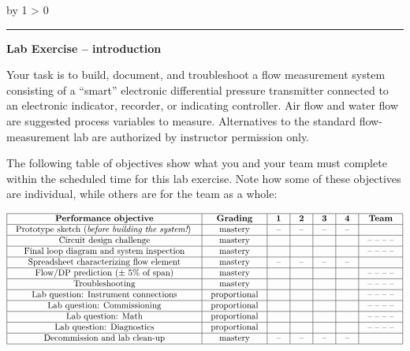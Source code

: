 \documentclass[12pt,a4paper]{article}
\def\oppgave{
            \advance\questnum by 1
            \ifnum \questnum > 0
                 \hrule
                 \vskip 3pt
                 \leftline{Oppgave \the\questnum}
                 \vskip 3pt \fi}
\begin{document}
\begin{itemize}



\vfil \eject 



\oppgave{} 

\noindent
{\bf Lab Exercise -- introduction}

\vskip 5pt

Your task is to build, document, and troubleshoot a flow measurement system consisting of a ``smart'' electronic differential pressure transmitter connected to an electronic indicator, recorder, or indicating controller.  Air flow and water flow are suggested process variables to measure.  Alternatives to the standard flow-measurement lab are authorized by instructor permission only.

The following table of objectives show what you and your team must complete within the scheduled time for this lab exercise.  Note how some of these objectives are individual, while others are for the team as a whole:



$$\vbox{\offinterlineskip
\halign{\strut
\vrule \quad\hfil # \ \hfil & 
\vrule \quad\hfil # \ \hfil & 
\vrule \quad\hfil # \ \hfil & 
\vrule \quad\hfil # \ \hfil & 
\vrule \quad\hfil # \ \hfil & 
\vrule \quad\hfil # \ \hfil & 
\vrule \quad\hfil # \ \hfil \vrule \cr
\noalign{\hrule}
%
{\bf Performance objective} & {\bf Grading} & {\bf 1} & {\bf 2} & {\bf 3} & {\bf 4} & {\bf Team} \cr
%
\noalign{\hrule}
%
Prototype sketch ({\it before building the system!}) & mastery & -- & -- & -- & -- & \cr
%
\noalign{\hrule}
%
Circuit design challenge & mastery & & & & & -- -- -- -- \cr
%
\noalign{\hrule}
%
Final loop diagram and system inspection & mastery & & & & & -- -- -- -- \cr
%
\noalign{\hrule}
%
Spreadsheet characterizing flow element & mastery & -- & -- & -- & -- &  \cr
%
\noalign{\hrule}
%
Flow/DP prediction ($\pm$ 5\% of span) & mastery & & & & & -- -- -- -- \cr
%
\noalign{\hrule}
%
Troubleshooting & mastery & & & & & -- -- -- -- \cr
%
\noalign{\hrule}
%
Lab question: Instrument connections & proportional &  &  &  &  & -- -- -- -- \cr
%
\noalign{\hrule}
%
Lab question: Commissioning & proportional &  &  &  &  & -- -- -- -- \cr
%
\noalign{\hrule}
%
Lab question: Math & proportional &  &  &  &  & -- -- -- -- \cr
%
\noalign{\hrule}
%
Lab question: Diagnostics & proportional &  &  &  &  & -- -- -- -- \cr
%
\noalign{\hrule}
%
Decommission and lab clean-up & mastery & -- & -- & -- & -- &  \cr
%
\noalign{\hrule}
} %
}$$ %


\end{itemize}
\end{document}
